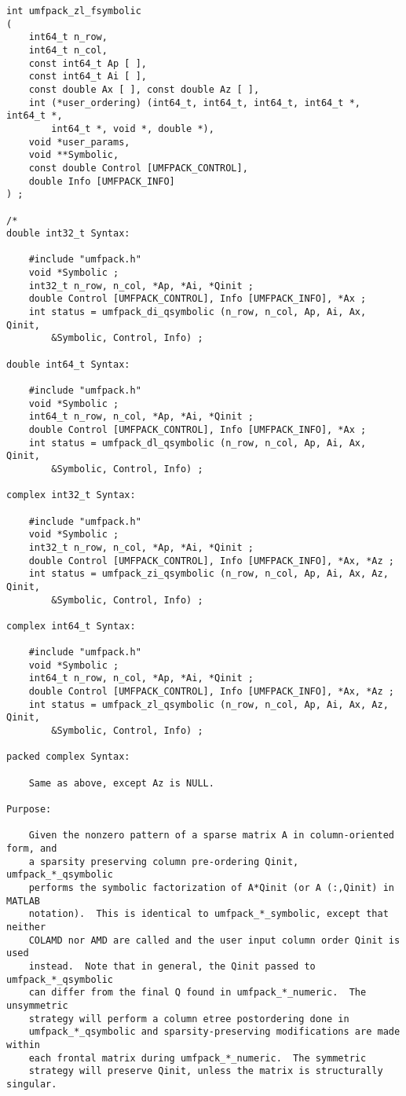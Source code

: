 \documentclass[11pt]{article}
\begin{document}
{\begin{verbatim}
int umfpack_zl_fsymbolic
(
    int64_t n_row,
    int64_t n_col,
    const int64_t Ap [ ],
    const int64_t Ai [ ],
    const double Ax [ ], const double Az [ ],
    int (*user_ordering) (int64_t, int64_t, int64_t, int64_t *, int64_t *,
        int64_t *, void *, double *),
    void *user_params,
    void **Symbolic,
    const double Control [UMFPACK_CONTROL],
    double Info [UMFPACK_INFO]
) ;

/*
double int32_t Syntax:

    #include "umfpack.h"
    void *Symbolic ;
    int32_t n_row, n_col, *Ap, *Ai, *Qinit ;
    double Control [UMFPACK_CONTROL], Info [UMFPACK_INFO], *Ax ;
    int status = umfpack_di_qsymbolic (n_row, n_col, Ap, Ai, Ax, Qinit,
        &Symbolic, Control, Info) ;

double int64_t Syntax:

    #include "umfpack.h"
    void *Symbolic ;
    int64_t n_row, n_col, *Ap, *Ai, *Qinit ;
    double Control [UMFPACK_CONTROL], Info [UMFPACK_INFO], *Ax ;
    int status = umfpack_dl_qsymbolic (n_row, n_col, Ap, Ai, Ax, Qinit,
        &Symbolic, Control, Info) ;

complex int32_t Syntax:

    #include "umfpack.h"
    void *Symbolic ;
    int32_t n_row, n_col, *Ap, *Ai, *Qinit ;
    double Control [UMFPACK_CONTROL], Info [UMFPACK_INFO], *Ax, *Az ;
    int status = umfpack_zi_qsymbolic (n_row, n_col, Ap, Ai, Ax, Az, Qinit,
        &Symbolic, Control, Info) ;

complex int64_t Syntax:

    #include "umfpack.h"
    void *Symbolic ;
    int64_t n_row, n_col, *Ap, *Ai, *Qinit ;
    double Control [UMFPACK_CONTROL], Info [UMFPACK_INFO], *Ax, *Az ;
    int status = umfpack_zl_qsymbolic (n_row, n_col, Ap, Ai, Ax, Az, Qinit,
        &Symbolic, Control, Info) ;

packed complex Syntax:

    Same as above, except Az is NULL.

Purpose:

    Given the nonzero pattern of a sparse matrix A in column-oriented form, and
    a sparsity preserving column pre-ordering Qinit, umfpack_*_qsymbolic
    performs the symbolic factorization of A*Qinit (or A (:,Qinit) in MATLAB
    notation).  This is identical to umfpack_*_symbolic, except that neither
    COLAMD nor AMD are called and the user input column order Qinit is used
    instead.  Note that in general, the Qinit passed to umfpack_*_qsymbolic
    can differ from the final Q found in umfpack_*_numeric.  The unsymmetric
    strategy will perform a column etree postordering done in
    umfpack_*_qsymbolic and sparsity-preserving modifications are made within
    each frontal matrix during umfpack_*_numeric.  The symmetric
    strategy will preserve Qinit, unless the matrix is structurally singular.


\end{verbatim}}
\end{document}
